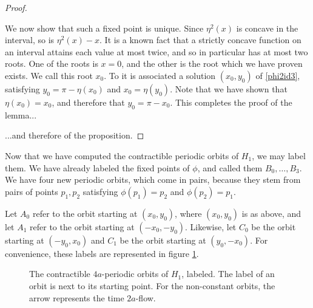 \begin{proof}
\begin{lemmaproof}
We now show that such a fixed point is unique. Since $\eta^2(x)$ is concave in the interval, so is $\eta^2(x) - x$. It is a known fact that a strictly concave function on an interval attains each value at most twice, and so in particular has at most two roots. One of the roots is $x = 0$, and the other is the root which we have proven exists. We call this root $x_0$. To it is associated a solution $(x_0, y_0)$ of \eqref{phi2id3}, satisfying $y_0 = \pi - \eta(x_0)$ and $x_0 = \eta(y_0)$. Note that we have shown that $\eta(x_0) = x_0$, and therefore that $y_0 = \pi - x_0$. This completes the proof of the lemma...
\end{lemmaproof}
...and therefore of the proposition.
\end{proof}

Now that we have computed the contractible periodic orbits of $H_1$, we may label them. We have already labeled the fixed points of $\phi$, and called them $B_0, \dots, B_3$. We have four new periodic orbits, which come in pairs, because they stem from pairs of points $p_1, p_2$ satisfying $\phi(p_1) = p_2$ and $\phi(p_2) = p_1$.

Let $A_0$ refer to the orbit starting at $(x_0, y_0)$, where $(x_0, y_0)$ is as above, and let $A_1$ refer to the orbit starting at $(-x_0, -y_0)$. Likewise, let $C_0$ be the orbit starting at $(-y_0, x_0)$ and $C_1$ be the orbit starting at $(y_0, -x_0)$. For convenience, these labels are represented in figure \ref{orbitsh12}.

\begin{figure}
\centering
{}
\caption{The contractible $4a$-periodic orbits of $H_1$, labeled. The label of an orbit is next to its starting point. For the non-constant orbits, the arrow represents the time $2a$-flow.}
\label{orbitsh12}
\end{figure}


